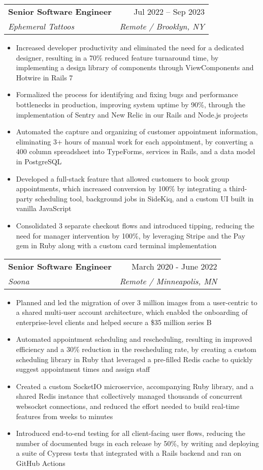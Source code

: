 \documentclass[letterpaper,12pt]{article}
\makeatletter
\newcommand{\resumeItem}[1]{
  \item\small{
    {#1 \vspace{-2pt}}
  }
}
\newcommand{\resumeSubheading}[4]{
  \vspace{-2pt}\item
    \begin{tabular*}{0.97\textwidth}[t]{l@{\extracolsep{\fill}}r}
      \textbf{#1} & #2 \\
      \textit{\small#3} & \textit{\small #4} \\
    \end{tabular*}\vspace{-7pt}
}
\newcommand{\resumeItemListStart}{\begin{itemize}}
\newcommand{\resumeItemListEnd}{\end{itemize}\vspace{-5pt}}
\makeatother
\begin{document}
    \resumeSubheading
      {Senior Software Engineer}{Jul 2022 – Sep 2023}
      {Ephemeral Tattoos}{Remote / Brooklyn, NY}
      \resumeItemListStart
        \resumeItem{Increased developer productivity and eliminated the need for a dedicated designer, resulting in a 70\% reduced feature turnaround time, by implementing a design library of components through ViewComponents and Hotwire in Rails 7}
        \resumeItem{Formalized the process for identifying and fixing bugs and performance bottlenecks in production, improving system uptime by 90\%, through the implementation of Sentry and New Relic in our Rails and Node.js projects}
        \resumeItem{Automated the capture and organizing of customer appointment information, eliminating 3+ hours of manual work for each appointment, by converting a 400 column spreadsheet into TypeForms, services in Rails, and a data model in PostgreSQL}
        \resumeItem{Developed a full-stack feature that allowed customers to book group appointments, which increased conversion by 100\% by integrating a third-party scheduling tool, background jobs in SideKiq, and a custom UI built in vanilla JavaScript}
        \resumeItem{Consolidated 3 separate checkout flows and introduced tipping, reducing the need for manager intervention by 100\%, by leveraging Stripe and the Pay gem in Ruby along with a custom card terminal implementation}
      \resumeItemListEnd

    \resumeSubheading
      {Senior Software Engineer}{March 2020 - June 2022}
      {Soona}{Remote / Minneapolis, MN}
      \resumeItemListStart
        \resumeItem{Planned and led the migration of over 3 million images from a user-centric to a shared multi-user account architecture, which enabled the onboarding of enterprise-level clients and helped secure a \$35 million series B}
        \resumeItem{Automated appointment scheduling and rescheduling, resulting in improved efficiency and a 30\% reduction in the rescheduling rate, by creating a custom scheduling library in Ruby that leveraged a pre-filled Redis cache to quickly suggest appointment times and assign staff}
        \resumeItem{Created a custom SocketIO microservice, accompanying Ruby library, and a shared Redis instance that collectively managed thousands of concurrent websocket connections, and reduced the effort needed to build real-time features from weeks to minutes}
        \resumeItem{Introduced end-to-end testing for all client-facing user flows, reducing the number of documented bugs in each release by 50\%, by writing and deploying a suite of Cypress tests that integrated with a Rails backend and ran on GitHub Actions}
      \resumeItemListEnd
\end{document}
